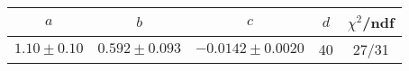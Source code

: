 \begin{tabular}{c|c|c|c|c}
$a$ & $b$ & $c$ & $d$ & $\chi^2$/ndf \\
\hline
$1.10\pm0.10$ & $0.592\pm0.093$ & $-0.0142\pm0.0020$ & 40 & 27/31
\end{tabular}
